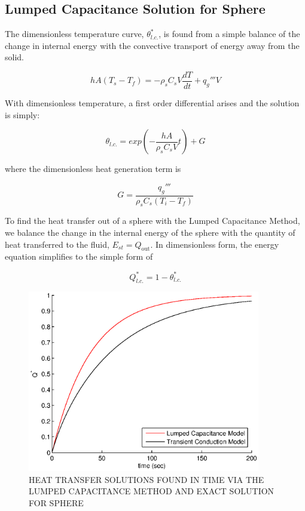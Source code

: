 
\subsection{Lumped Capacitance Solution for Sphere}
The dimensionless temperature curve, $\theta_{l.c.}^*$, is found from a simple balance of the change in internal energy with the convective transport of energy away from the solid.  

\begin{equation}
	hA(T_s-T_f)=-\rho_sC_sV\frac{dT}{dt} + q_g'''V
\end{equation}

With dimensionless temperature, a first order differential arises and the solution is simply:

\begin{equation}
\label{eq:thetalc}
	\theta_{l.c.}=exp\left(-\frac{hA}{\rho_s C_s V}t\right) + G
\end{equation}

where the dimensionless heat generation term is 

\begin{equation}
	G = \frac{q_g'''}{\rho_sC_s(T_{i}-T_{f})}
\end{equation}

To find the heat transfer out of a sphere with the Lumped Capacitance Method, we balance the change in the internal energy of the sphere with the quantity of heat transferred to the fluid, $E_{st} = Q_{\text{out}}$. In dimensionless form, the energy equation simplifies to the simple form of

\begin{equation}
	Q^*_{l.c.}=1-\theta^*_{l.c.}
\label{eq:qlc}
\end{equation}



\begin{figure}[ht]
	\centering
		\includegraphics[width=4in]{chapters/figures/qlcandqexact}
	\caption[Heat transfer solutions for single sphere]{HEAT TRANSFER SOLUTIONS FOUND IN TIME VIA THE LUMPED CAPACITANCE METHOD AND EXACT SOLUTION FOR SPHERE}
	\label{fig:qlcandqexact}
\end{figure}

